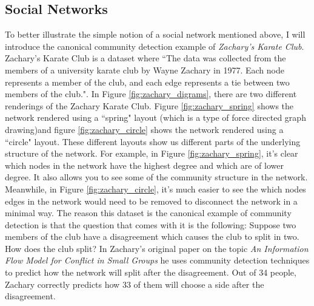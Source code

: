 \subsection{Social Networks}\label{sec:Social Networks}
To better illustrate the simple notion of a social network mentioned above, I will introduce the canonical community detection example of \emph{Zachary's Karate Club}. Zachary's Karate Club is a dataset where ``The data was collected from the members of a university karate club by Wayne Zachary in 1977.  Each node represents a member of the club, and each edge represents a tie between two members of the club."\cite[Metadata]{konect:2017:ucidata-zachary}. In Figure \ref{fig:zachary_digrams}, there are two different renderings of the Zachary Karate Club. Figure \ref{fig:zachary_spring} shows the network rendered using a ``spring" layout (which is a type of force directed graph drawing\cite{kobourov12})and figure \ref{fig:zachary_circle} shows the network rendered using a ``circle" layout. These different layouts show us different parts of the underlying structure of the network. For example, in Figure \ref{fig:zachary_spring}, it's clear which nodes in the network have the highest degree and which are of lower degree. It also allows you to see some of the community structure in the network. Meanwhile, in Figure \ref{fig:zachary_circle}, it's much easier to see the which nodes edges in the network would need to be removed to disconnect the network in a minimal way. The reason this dataset is the canonical example of community detection is that the question that comes with it is the following: Suppose two members of the club have a disagreement which causes the club to split in two. How does the club split? In Zachary's original paper on the topic \emph{An Information Flow Model for Conflict in Small Groups}\cite{zachary77} he uses community detection techniques to predict how the network will split after the disagreement. Out of 34 people, Zachary correctly predicts how 33 of them will choose a side after the disagreement.

